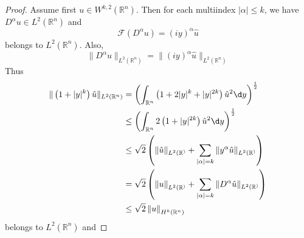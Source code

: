 \begin{theorem}
    \begin{proof}
        Assume first $u\in W^{k,2}(\mathbb{R}^n)$. Then for each multiindex $\left|\alpha\right| \leq k$, we have $D^\alpha u \in L^2 (\mathbb{R}^n)$ and
        \begin{equation*}
            \mathcal{F}(D^\alpha u)= (iy)^\alpha \hat{u}
        \end{equation*}
        belongs to $L^2 (\mathbb{R}^n)$. Also,
        $$\|D^\alpha u\|_{L^2 (\mathbb{R}^n)}=\|(iy)^\alpha \hat{u}\|_{L^2 (\mathbb{R}^n)}$$
        Thus
        \begin{equation*}
            \begin{aligned}
                \|\left(1+|y|^k\right) \hat{u} \|_{L^2 (\mathbb{R}^n)} &
                = \left(\int_{\mathbb{R}^n} \left(1+2|y|^k+|y|^{2k}\right) \hat{u}^2 \d y\right)^{\frac{1}{2}}                                                                                             \\
                                                                       & \leq \left(\int_{\mathbb{R}^n} 2\left(1+|y|^{2k}\right) \hat{u}^2 \d y\right)^{\frac{1}{2}}                                       \\
                                                                       & \leq \sqrt{2} \left(\|\hat{u}\|_{L^2(\mathbb{R}^)}+ \sum_{\left|\alpha\right|=k} \|y^\alpha \hat{u}\|_{L^2(\mathbb{R}^)}\right)   \\
                                                                       & = \sqrt{2} \left(\left\|u\right\|_{L^2(\mathbb{R}^)} + \sum_{\left|\alpha\right|=k}\|D^\alpha \hat{u}\|_{L^2(\mathbb{R}^)}\right) \\
                                                                       & \leq \sqrt{2}\left\|u\right\|_{H^k\left(\mathbb{R}^n\right)}
            \end{aligned}
        \end{equation*}
        belongs to $L^2 (\mathbb{R}^n)$ and


\end{proof}
\end{theorem}
